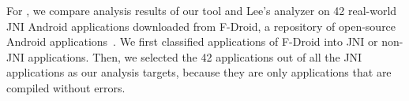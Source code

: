 
For , we compare analysis results of our tool and Lee's analyzer on 42
real-world JNI Android applications downloaded from F-Droid, a repository of
open-source Android applications~\cite{fdroid}. We first classified
applications of F-Droid into JNI or non-JNI applications. Then, we selected the
42 applications out of all the JNI applications as our analysis targets,
because they are only applications that are compiled without errors.







